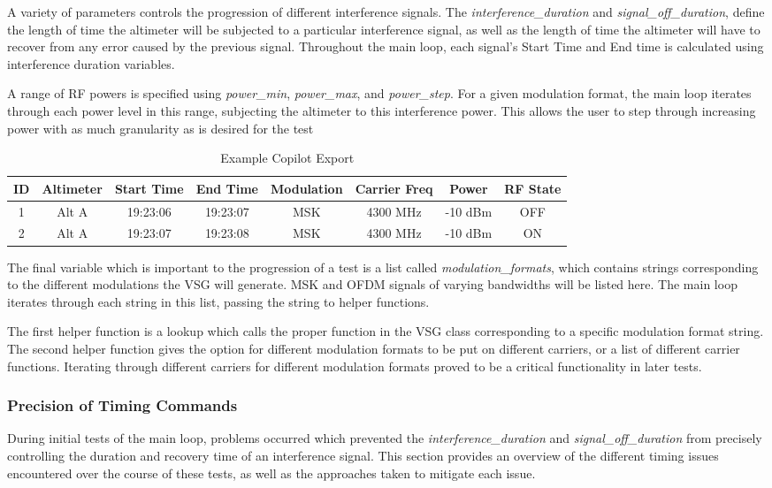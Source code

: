 A variety of parameters controls the progression of different interference signals. The \textit{interference\_duration} and \textit{signal\_off\_duration}, define the length of time the altimeter will be subjected to a particular interference signal, as well as the length of time the altimeter will have to recover from any error caused by the previous signal. Throughout the main loop, each signal's Start Time and End time is calculated using interference duration variables. 

 A range of RF powers is specified using \textit{power\_min}, \textit{power\_max}, and \textit{power\_step}. For a given modulation format, the main loop iterates through each power level in this range, subjecting the altimeter to this interference power. This allows the user to step through increasing power with as much granularity as is desired for the test

\begin{table}[]
\centering
\begin{tabular}{@{}cccccccc@{}}
\toprule
ID & Altimeter   & Start Time          & End Time            & Modulation &Carrier Freq& Power & RF State \\ \midrule
1  & Alt A & 19:23:06 & 19:23:07 & MSK & 4300  MHz & -10  dBm & OFF      \\
2  & Alt A & 19:23:07 & 19:23:08 & MSK & 4300   MHz & -10 dBm& ON       \\ \bottomrule
\end{tabular}
\caption{Example Copilot Export}
\label{tab:Interference}
\end{table}

The final variable which is important to the progression of a test is a list called \textit{modulation\_formats}, which contains strings corresponding to the different modulations the VSG will generate. MSK and OFDM signals of varying bandwidths will be listed here. The main loop iterates through each string in this list, passing the string to helper functions. 

The first helper function is a lookup which calls the proper function in the VSG class corresponding to a specific modulation format string. The second helper function gives the option for different modulation formats to be put on different carriers, or a list of different carrier functions. Iterating through different carriers for different modulation formats proved to be a critical functionality in later tests.

\subsubsection{Precision of Timing Commands}\label{subsub:timing}
During initial tests of the main loop, problems occurred which prevented the \textit{interference\_duration} and \textit{signal\_off\_duration} from precisely controlling the duration and recovery time of an interference signal. This section provides an overview of the different timing issues encountered over the course of these tests, as well as the approaches taken to mitigate each issue. 
 
